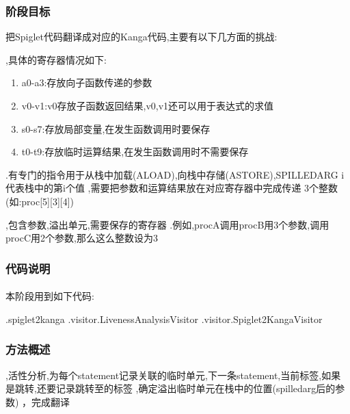 \documentclass[11pt, oneside]{article}   	%
\begin{document}
\begin{spacing}{1.55}
	\subsubsection{阶段目标}
	把Spiglet代码翻译成对应的Kanga代码,主要有以下几方面的挑战:
	\begin{enumerate}
	,具体的寄存器情况如下:
	\begin{enumerate}
	\item a0-a3:存放向子函数传递的参数
	\item v0-v1:v0存放子函数返回结果,v0,v1还可以用于表达式的求值
	\item s0-s7:存放局部变量,在发生函数调用时要保存
	\item t0-t9:存放临时运算结果,在发生函数调用时不需要保存
	\end{enumerate}
	.有专门的指令用于从栈中加载(ALOAD),向栈中存储(ASTORE),SPILLEDARG i代表栈中的第i个值
	,需要把参数和运算结果放在对应寄存器中完成传递
	3个整数(如:proc[5][3][4])
	\begin{enumerate}
	,包含参数,溢出单元,需要保存的寄存器
	.例如,procA调用procB用3个参数,调用procC用2个参数,那么这么整数设为3
	\end{enumerate}
	\end{enumerate}
	\subsubsection{代码说明}
	\paragraph{}
	本阶段用到如下代码:
	\begin{enumerate}
	.spiglet2kanga
	.visitor.LivenessAnalysisVisitor
	.visitor.Spiglet2KangaVisitor
	\end{enumerate}
	\subsubsection{方法概述}
	\begin{enumerate}
	,活性分析,为每个statement记录关联的临时单元,下一条statement,当前标签,如果是跳转,还要记录跳转至的标签
	,确定溢出临时单元在栈中的位置(spilledarg后的参数)
	，完成翻译
	\end{enumerate}

\end{spacing}
\end{document}
